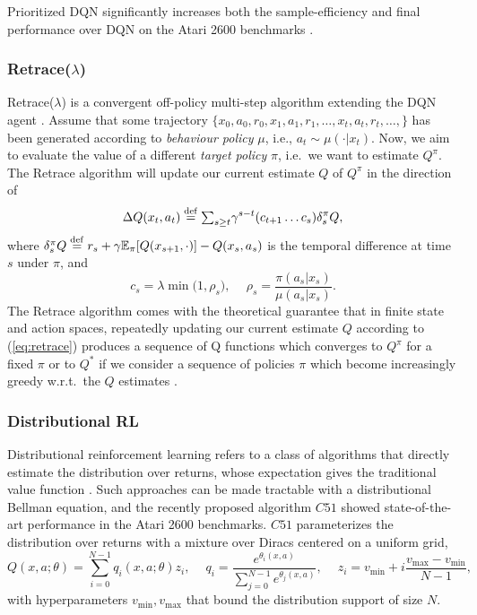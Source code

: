 \documentclass{article}
\newcommand{\beq}{\begin{equation}}
\newcommand{\eeq}{\end{equation}}
\newcommand{\beqa}{\begin{eqnarray}}
\newcommand{\eeqa}{\end{eqnarray}}
\newcommand{\E}{{\mathbb E}}
\newcommand{\eqdef}{\stackrel{\rm def}{=}}
\begin{document}
Prioritized DQN significantly increases both the sample-efficiency and final 
performance over DQN on the Atari 2600 benchmarks \citep{schaul2015prioritized}.

\subsubsection{Retrace($\lambda$)}\label{sec:retrace}
Retrace($\lambda$) is a convergent off-policy multi-step algorithm extending the 
DQN agent \citep{munos2016safe}. Assume that some trajectory $\{x_0, a_0, r_0, x_1, a_1, 
r_1, \dots, x_t, a_t, r_t, \dots, \}$ has been generated according to {\em 
behaviour policy} $\mu$, i.e., $a_t\sim \mu(\cdot|x_t)$. Now, we aim to 
evaluate the value of a different {\em target policy} $\pi$, i.e.~we want to 
estimate 
$Q^{\pi}$. The Retrace algorithm will update our current estimate $Q$ of 
$Q^{\pi}$ in the direction of
\beqa\label{eq:retrace}
\Delta Q(x_t, a_t)\eqdef {\textstyle \sum_{s\geq t}} \gamma^{s-t} (c_{t+1}\dots 
c_s) 
\delta^{\pi}_s Q ,
\eeqa
where $\delta^{\pi}_s Q \eqdef  r_s+\gamma \E_{\pi} [Q(x_{s+1},\cdot)] - 
Q(x_s,a_s)$ is the temporal difference at time $s$ under $\pi$, 
and 
\beq \label{eq:trace.cut}
c_s=\lambda\min\big(1,\rho_s\big),\ \quad \rho_s = 
\frac{\pi(a_s|x_s)}{\mu(a_s|x_s)}.
\eeq 
The Retrace algorithm comes with the theoretical guarantee that in finite state 
and action spaces, repeatedly updating our current estimate $Q$ according to 
(\ref{eq:retrace}) produces a sequence of Q functions which converges to 
$Q^{\pi}$ for a fixed 
$\pi$ or to $Q^*$ if we consider a sequence of policies $\pi$ which become 
increasingly greedy w.r.t.~the $Q$ estimates \citep{munos2016safe}.

\subsubsection{Distributional RL}\label{sec:distrl}
Distributional reinforcement learning refers to a class of algorithms that 
directly estimate the distribution over returns, 
whose expectation gives the traditional value function 
\citep{bellemare2017distributional}. Such approaches can be made 
tractable with a distributional Bellman equation, and the recently proposed 
algorithm $C51$ showed state-of-the-art performance 
in the Atari 2600 benchmarks. $C51$ parameterizes the distribution over returns 
with a mixture over Diracs centered on a uniform grid,
\begin{equation}
Q(x, a; \theta) = \sum_{i=0}^{N-1} q_i(x, a; \theta) z_i,\ \quad q_i = 
\frac{e^{\theta_i(x, a)}}{\sum_{j=0}^{N-1} e^{\theta_j(x, a)}},\ \quad z_i = v_{\min} + i 
\frac{v_{\max} - v_{\min}}{N-1},
\end{equation}
with hyperparameters $v_{\min} , v_{\max}$ that bound the distribution support of size $N$.
\end{document}
